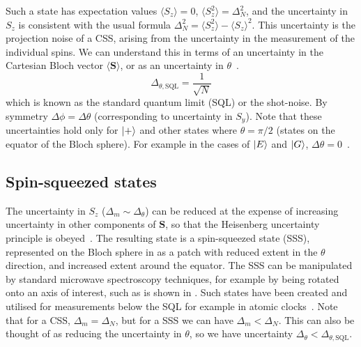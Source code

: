 Such a state has expectation values $\langle S_z \rangle = 0$, $\langle
S_z^2\rangle = \Delta_N^2$, and the uncertainty in $S_z$ is consistent with the
usual formula $\Delta_N^2 = \langle S_z^2 \rangle - \langle S_z\rangle^2$. This
uncertainty is the projection noise of a CSS, arising from the uncertainty in
the measurement of the individual spins. We can understand this in terms of an
uncertainty in the Cartesian Bloch vector $\langle \mathbf{S} \rangle$, or as
an uncertainty in $\theta$~\cite{PhysRevA.47.3554}.
%
%
\begin{equation}
  \Delta_{\theta, \text{SQL}} = \frac{1}{\sqrt{N}}
\end{equation}
which is known as the standard quantum limit (SQL) or the shot-noise. By
symmetry $\Delta \phi = \Delta \theta$ (corresponding to uncertainty in $S_y$).
%
Note that these uncertainties hold only for $\ket{+}$ and other states where
$\theta = \pi/2$ (states on the equator of the Bloch sphere). For example in the
cases of $\ket{E}$ and $\ket{G}$, $\Delta \theta = 0$~\cite{PhysRevA.47.3554}.

\subsection{Spin-squeezed states}

The uncertainty in $S_z$ ($\Delta_m \sim \Delta_\theta$) can be reduced at the
expense of increasing uncertainty in other components of $\mathbf{S}$, so that
the Heisenberg uncertainty principle is obeyed~\cite{PhysRevA.47.3554}.
The resulting state is a spin-squeezed state (SSS), represented on the
Bloch sphere in  as a patch with reduced extent
in the $\theta$ direction, and increased extent around the equator. The SSS can
be manipulated by standard microwave spectroscopy techniques, for example by
being rotated onto an axis of interest, such as is shown in
. Such states have been created and utilised
for measurements below the SQL for example in atomic clocks~\cite{Schulte2020}.
%
Note that for a CSS, $\Delta_m = \Delta_N$, but for a SSS we can have $\Delta_m
< \Delta_N$. This can also be thought of as reducing the uncertainty in
$\theta$, so we have uncertainty $\Delta_\theta < \Delta_{\theta, \text{SQL}}$.

